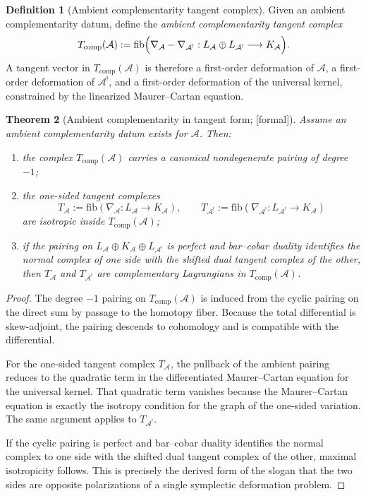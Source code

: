 \documentclass[11pt,oneside]{memoir}
\numberwithin{equation}{chapter}
\newtheorem{theorem}{Theorem}[chapter]
\theoremstyle{definition}
\newtheorem{definition}[theorem]{Definition}
\newcommand{\ClaimStatusProvedHere}{\textnormal{[formal]}}
\newcommand{\cA}{\mathcal A}
\begin{document}
\begin{definition}[Ambient complementarity tangent complex]
\label{def:nms-ambient-tangent-complex}
Given an ambient complementarity datum, define the \emph{ambient complementarity tangent complex}
\begin{equation}
\label{eq:nms-ambient-tangent}
T_{\mathrm{comp}}(\cA)
:=
\mathrm{fib}\Bigl(
\nabla_{\cA}-\nabla_{\cA^!}:
L_{\cA}\oplus L_{\cA^!}\longrightarrow K_{\cA}
\Bigr).
\end{equation}
A tangent vector in $T_{\mathrm{comp}}(\cA)$ is therefore a first-order deformation of $\cA$, a first-order deformation of $\cA^!$, and a first-order deformation of the universal kernel, constrained by the linearized Maurer--Cartan equation.
\end{definition}

\begin{theorem}[Ambient complementarity in tangent form; \ClaimStatusProvedHere]
\label{thm:nms-ambient-complementarity-tangent}
Assume an ambient complementarity datum exists for $\cA$.  Then:
\begin{enumerate}[label=\textup{(\roman*)}]
\item the complex $T_{\mathrm{comp}}(\cA)$ carries a canonical nondegenerate pairing of degree $-1$;
\item the one-sided tangent complexes
\[
T_{\cA}:=\mathrm{fib}(\nabla_{\cA}:L_{\cA}\to K_{\cA}),
\qquad
T_{\cA^!}:=\mathrm{fib}(\nabla_{\cA^!}:L_{\cA^!}\to K_{\cA})
\]
are isotropic inside $T_{\mathrm{comp}}(\cA)$;
\item if the pairing on $L_{\cA}\oplus K_{\cA}\oplus L_{\cA^!}$ is perfect and bar--cobar duality identifies the normal complex of one side with the shifted dual tangent complex of the other, then $T_{\cA}$ and $T_{\cA^!}$ are complementary Lagrangians in $T_{\mathrm{comp}}(\cA)$.
\end{enumerate}
\end{theorem}

\begin{proof}
The degree $-1$ pairing on $T_{\mathrm{comp}}(\cA)$ is induced from the cyclic pairing on the direct sum by passage to the homotopy fiber.  Because the total differential is skew-adjoint, the pairing descends to cohomology and is compatible with the differential.

For the one-sided tangent complex $T_{\cA}$, the pullback of the ambient pairing reduces to the quadratic term in the differentiated Maurer--Cartan equation for the universal kernel.  That quadratic term vanishes because the Maurer--Cartan equation is exactly the isotropy condition for the graph of the one-sided variation.  The same argument applies to $T_{\cA^!}$.

If the cyclic pairing is perfect and bar--cobar duality identifies the normal complex to one side with the shifted dual tangent complex of the other, maximal isotropicity follows.  This is precisely the derived form of the slogan that the two sides are opposite polarizations of a single symplectic deformation problem.\qedhere
\end{proof}
\end{document}
